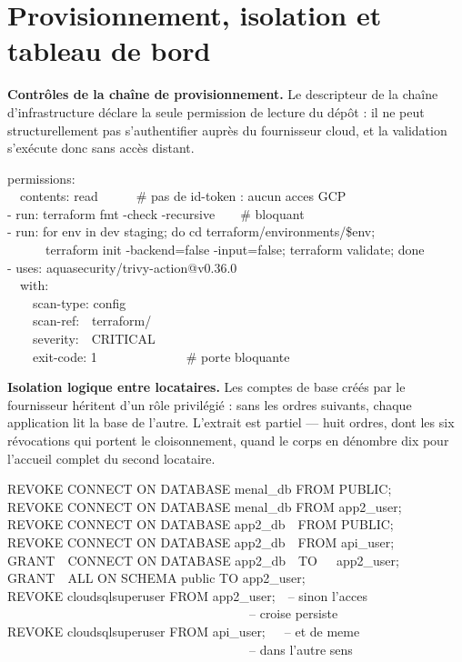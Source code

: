 \section{Provisionnement, isolation et tableau de bord}

\textbf{Contrôles de la chaîne de provisionnement.} Le descripteur de la chaîne d'infrastructure
déclare la seule permission de lecture du dépôt : il ne peut structurellement pas s'authentifier
auprès du fournisseur cloud, et la validation s'exécute donc sans accès distant.

\begin{extraitconf}[boxsep=1pt, left=3pt, right=3pt, top=2pt, bottom=2pt]
permissions:\\
\ \ contents: read\ \ \ \ \ \ \# pas de id-token : aucun acces GCP\\[0.4em]
- run: terraform fmt -check -recursive\ \ \ \ \# bloquant\\
- run: for env in dev staging; do cd terraform/environments/\$env;\\
\ \ \ \ \ \ terraform init -backend=false -input=false; terraform validate; done\\[0.4em]
- uses: aquasecurity/trivy-action@v0.36.0\\
\ \ with:\\
\ \ \ \ scan-type: config\\
\ \ \ \ scan-ref:\ \ terraform/\\
\ \ \ \ severity:\ \ CRITICAL\\
\ \ \ \ exit-code: 1\ \ \ \ \ \ \ \ \ \ \ \ \ \ \# porte bloquante
\end{extraitconf}

\textbf{Isolation logique entre locataires.} Les comptes de base créés par le fournisseur héritent
d'un rôle privilégié : sans les ordres suivants, chaque application lit la base de l'autre.
L'extrait est partiel --- huit ordres, dont les six révocations qui portent le cloisonnement, quand
le corps en dénombre dix pour l'accueil complet du second locataire.

\begin{extraitconf}[boxsep=1pt, left=3pt, right=3pt, top=2pt, bottom=2pt]
REVOKE CONNECT ON DATABASE menal\_db FROM PUBLIC;\\
REVOKE CONNECT ON DATABASE menal\_db FROM app2\_user;\\
REVOKE CONNECT ON DATABASE app2\_db\ \ FROM PUBLIC;\\
REVOKE CONNECT ON DATABASE app2\_db\ \ FROM api\_user;\\
GRANT\ \ CONNECT ON DATABASE app2\_db\ \ TO\ \ \ app2\_user;\\
GRANT\ \ ALL ON SCHEMA public TO app2\_user;\\
REVOKE cloudsqlsuperuser FROM app2\_user;\ \ -- sinon l'acces\\
\ \ \ \ \ \ \ \ \ \ \ \ \ \ \ \ \ \ \ \ \ \ \ \ \ \ \ \ \ \ \ \ \ \ \ \ \ \ -- croise persiste\\
REVOKE cloudsqlsuperuser FROM api\_user;\ \ \ -- et de meme\\
\ \ \ \ \ \ \ \ \ \ \ \ \ \ \ \ \ \ \ \ \ \ \ \ \ \ \ \ \ \ \ \ \ \ \ \ \ \ -- dans l'autre sens
\end{extraitconf}

